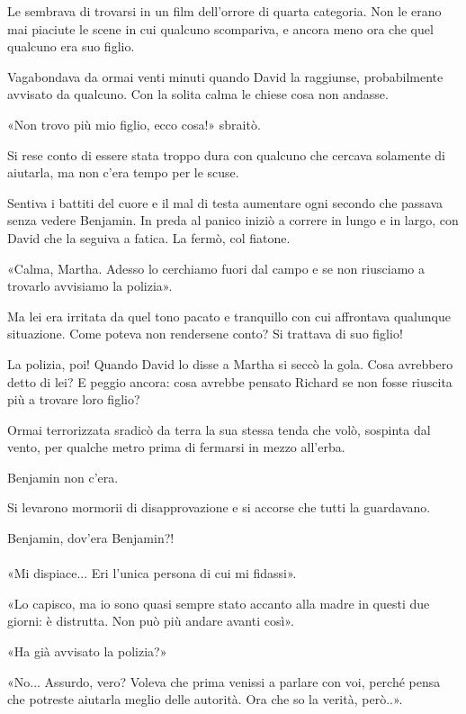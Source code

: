\documentclass[a4paper,12pt]{book}
\begin{document}
Le sembrava di trovarsi in un film dell'orrore di quarta categoria. Non le erano
mai piaciute le scene in cui qualcuno scompariva, e ancora meno ora che quel
qualcuno era suo figlio.

Vagabondava da ormai venti minuti quando David la raggiunse, probabilmente
avvisato da qualcuno. Con la solita calma le chiese cosa non andasse.

«Non trovo più mio figlio, ecco cosa!» sbraitò.

Si rese conto di essere stata troppo dura con qualcuno che cercava solamente di
aiutarla, ma non c'era tempo per le scuse.

Sentiva i battiti del cuore e il mal di testa aumentare ogni secondo che passava
senza vedere Benjamin. In preda al panico iniziò a correre in lungo e in largo,
con David che la seguiva a fatica. La fermò, col fiatone.

«Calma, Martha. Adesso lo cerchiamo fuori dal campo e se non riusciamo a
trovarlo avvisiamo la polizia».

Ma lei era irritata da quel tono pacato e tranquillo con cui affrontava
qualunque situazione. Come poteva non rendersene conto? Si trattava di suo
figlio!

La polizia, poi! Quando David lo disse a Martha si seccò la gola. Cosa
avrebbero detto di lei? E peggio ancora: cosa avrebbe pensato Richard se non
fosse riuscita più a trovare loro figlio?

Ormai terrorizzata sradicò da terra la sua stessa tenda che volò, sospinta dal
vento, per qualche metro prima di fermarsi in mezzo all'erba.

Benjamin non c'era.

Si levarono mormorii di disapprovazione e si accorse che tutti la guardavano.

Benjamin, dov'era Benjamin?!


\paragraph{}
«Mi dispiace... Eri l'unica persona di cui mi fidassi».

«Lo capisco, ma io sono quasi sempre stato accanto alla madre in questi due
giorni: è distrutta. Non può più andare avanti così».

«Ha già avvisato la polizia?»

«No... Assurdo, vero? Voleva che prima venissi a parlare con voi, perché pensa
che potreste aiutarla meglio delle autorità. Ora che so la verità, però..».
\end{document}

